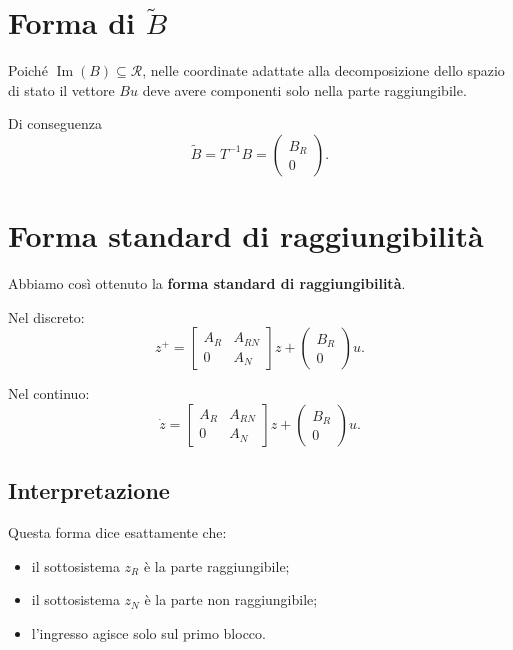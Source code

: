 \section{Forma di \(\tilde B\)}

Poiché \(\operatorname{Im}(B)\subseteq\mathcal{R}\), nelle coordinate adattate alla decomposizione dello spazio di stato il vettore \(Bu\) deve avere componenti solo nella parte raggiungibile.

Di conseguenza
\begin{equation}
\tilde B=T^{-1}B=
\begin{pmatrix}
B_R\\
0
\end{pmatrix}.
\label{eq:L12_Btriangolare}
\end{equation}

\section{Forma standard di raggiungibilità}

Abbiamo così ottenuto la \textbf{forma standard di raggiungibilità}.

Nel discreto:
\begin{equation}
z^{+}=
\begin{bmatrix}
A_R & A_{RN}\\
0 & A_N
\end{bmatrix}
z+
\begin{pmatrix}
B_R\\
0
\end{pmatrix}u.
\label{eq:L12_formastandard_td}
\end{equation}

Nel continuo:
\begin{equation}
\dot z=
\begin{bmatrix}
A_R & A_{RN}\\
0 & A_N
\end{bmatrix}
z+
\begin{pmatrix}
B_R\\
0
\end{pmatrix}u.
\label{eq:L12_formastandard_tc}
\end{equation}

\subsection*{Interpretazione}

Questa forma dice esattamente che:
\begin{itemize}
    \item il sottosistema \(z_R\) è la parte raggiungibile;
    \item il sottosistema \(z_N\) è la parte non raggiungibile;
    \item l’ingresso agisce solo sul primo blocco.
\end{itemize}

